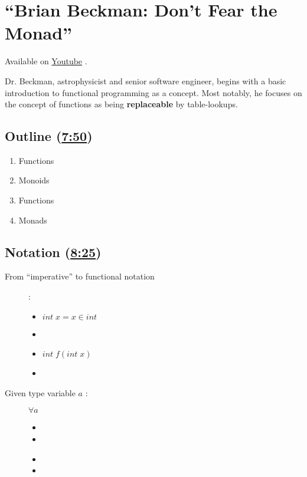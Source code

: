\chapter{``Brian Beckman: Don't Fear the Monad''}

Available on \href{https://youtu.be/ZhuHCtR3xq8}{Youtube} \cite{beckman2012}.

Dr. Beckman, astrophysicist and senior software engineer, begins with a basic
introduction to functional programming as a concept.  Most notably, he focuses
on the concept of functions as being \textbf{replaceable} by table-lookups.

\section{Outline (\href{https://youtu.be/ZhuHCtR3xq8?t=7m50s}{7:50})}

\begin{enumerate}
\item Functions
\item Monoids
\item Functions
\item Monads
\end{enumerate}

\section{Notation (\href{https://youtu.be/ZhuHCtR3xq8?t=7m50s}{8:25})}

\begin{description}
\item [From ``imperative'' to functional notation] :
  \begin{itemize}
  \item $int\;x= x \in int$
  \item {}
  \end{itemize}
  \begin{itemize}
  \item $int\;f(int\;x)$
  \item {}
  \end{itemize}
\item [Given type variable $a$ :] $\forall a$
  \begin{itemize}
  \item {}
  \item {}
  \end{itemize}
  \begin{itemize}
  \item {}
  \item {}
  \end{itemize}
\end{description}

